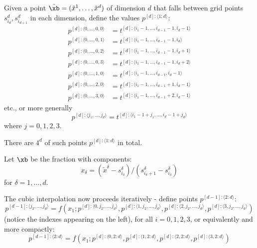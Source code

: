 \documentclass[11pt]{article}
\begin{document}
Given a point $\tilde{\xb} = (\tilde{x}^1, \dots, \tilde{x}^d)$ of dimension $d$ that falls between grid points $s_{i_d}^d, s_{i_{d+1}}^d$ in each dimension, define the values $p^{[d]: \langle 1:d \rangle}$:
\begin{equation*}
\begin{split}
p^{[d]:\langle 0, \dots, 0,0 \rangle} &= t^{[d]:\langle i_1-1, \dots, i_{d-1}-1, i_d-1 \rangle} \\
p^{[d]:\langle 0, \dots, 0,1 \rangle} &= t^{[d]:\langle i_1-1, \dots, i_{d-1}-1, i_d \rangle} \\
p^{[d]:\langle 0, \dots, 0,2 \rangle} &= t^{[d]:\langle i_1-1, \dots, i_{d-1}-1, i_d+1 \rangle} \\
p^{[d]:\langle 0, \dots, 0,3 \rangle} &= t^{[d]:\langle i_1-1, \dots, i_{d-1}-1, i_d+2 \rangle} \\
p^{[d]:\langle 0, \dots, 1,0 \rangle} &= t^{[d]:\langle i_1-1, \dots, i_{d-1}, i_d-1 \rangle} \\
p^{[d]:\langle 0, \dots, 2,0 \rangle} &= t^{[d]:\langle i_1-1, \dots, i_{d-1}+1, i_d-1 \rangle} \\
p^{[d]:\langle 0, \dots, 3,0 \rangle} &= t^{[d]:\langle i_1-1, \dots, i_{d-1}+2, i_d-1 \rangle}
\end{split}
\end{equation*}
etc., or more generally
\begin{equation*}
p^{[d]:\langle j_1, \dots, j_d \rangle} = t^{[d]:\langle i_1-1+j_1, \dots, i_d-1+j_d \rangle} 
\end{equation*}
where $j=0,1,2,3$.

There are $4^d$ of such points $p^{[d]: \langle 1:d \rangle}$ in total.

Let $\xb$ be the fraction with components:
\begin{equation}
x_\delta = (\tilde{x}^\delta - s_{i_\delta}^\delta) / (s_{i_\delta+1}^\delta - s_{i_\delta}^\delta)
\end{equation}
for $\delta=1,\dots,d$.

The cubic interpolation now proceeds iteratively - define points $p^{[d-1]: \langle 2: d \rangle}$:
\begin{equation}
p^{[d-1]: \langle j_2,\dots,j_d \rangle} = f \left ( 
x_1 ; 
p^{[d]: \langle 0,j_2,\dots,j_d \rangle},
p^{[d]: \langle 1,j_2,\dots,j_d \rangle},
p^{[d]: \langle 2,j_2,\dots,j_d \rangle},
p^{[d]: \langle 3,j_2,\dots,j_d \rangle}
\right )
\end{equation}
(notice the indexes appearing on the left), for all $i=0,1,2,3$, or equivalently and more compactly:
\begin{equation}
p^{[d-1]: \langle 2:d \rangle} = f \left ( 
x_1 ; 
p^{[d]: \langle 0,2:d \rangle},
p^{[d]: \langle 1,2:d \rangle},
p^{[d]: \langle 2,2:d \rangle},
p^{[d]: \langle 3,2:d \rangle}
\right )
\label{eq:iterate1}
\end{equation}
\end{document}
